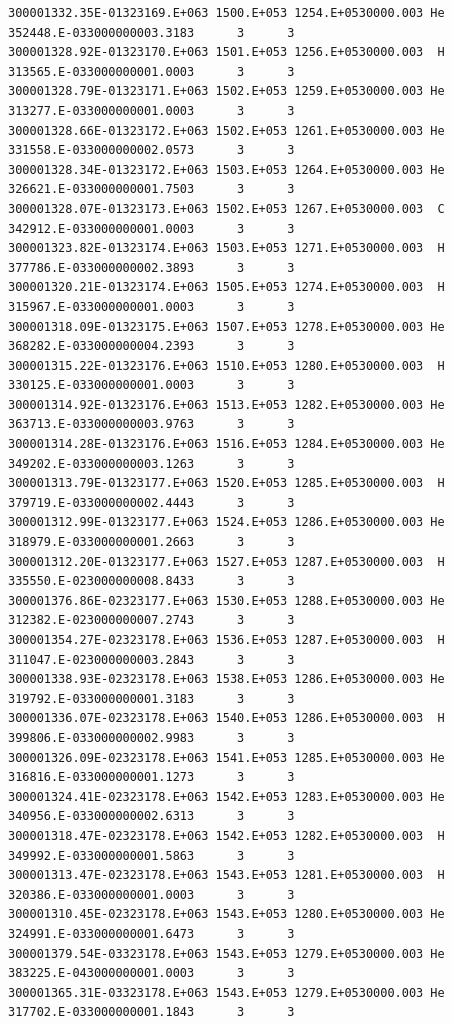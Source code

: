 \documentclass [11pt,a4paper,dvipdfmx] {jarticle}
\begin{document}
\begin{lstlisting}[caption={COLLISION.txtの例。1イベントのみ抽出。},basicstyle=\fontsize{6}{6}\ttfamily,identifierstyle=\fontsize{6}{6},numberstyle={\tiny},columns=fixed]
300001332.35E-01323169.E+063 1500.E+053 1254.E+0530000.003 He 352448.E-033000000003.3183      3      3
300001328.92E-01323170.E+063 1501.E+053 1256.E+0530000.003  H 313565.E-033000000001.0003      3      3
300001328.79E-01323171.E+063 1502.E+053 1259.E+0530000.003 He 313277.E-033000000001.0003      3      3
300001328.66E-01323172.E+063 1502.E+053 1261.E+0530000.003 He 331558.E-033000000002.0573      3      3
300001328.34E-01323172.E+063 1503.E+053 1264.E+0530000.003 He 326621.E-033000000001.7503      3      3
300001328.07E-01323173.E+063 1502.E+053 1267.E+0530000.003  C 342912.E-033000000001.0003      3      3
300001323.82E-01323174.E+063 1503.E+053 1271.E+0530000.003  H 377786.E-033000000002.3893      3      3
300001320.21E-01323174.E+063 1505.E+053 1274.E+0530000.003  H 315967.E-033000000001.0003      3      3
300001318.09E-01323175.E+063 1507.E+053 1278.E+0530000.003 He 368282.E-033000000004.2393      3      3
300001315.22E-01323176.E+063 1510.E+053 1280.E+0530000.003  H 330125.E-033000000001.0003      3      3
300001314.92E-01323176.E+063 1513.E+053 1282.E+0530000.003 He 363713.E-033000000003.9763      3      3
300001314.28E-01323176.E+063 1516.E+053 1284.E+0530000.003 He 349202.E-033000000003.1263      3      3
300001313.79E-01323177.E+063 1520.E+053 1285.E+0530000.003  H 379719.E-033000000002.4443      3      3
300001312.99E-01323177.E+063 1524.E+053 1286.E+0530000.003 He 318979.E-033000000001.2663      3      3
300001312.20E-01323177.E+063 1527.E+053 1287.E+0530000.003  H 335550.E-023000000008.8433      3      3
300001376.86E-02323177.E+063 1530.E+053 1288.E+0530000.003 He 312382.E-023000000007.2743      3      3
300001354.27E-02323178.E+063 1536.E+053 1287.E+0530000.003  H 311047.E-023000000003.2843      3      3
300001338.93E-02323178.E+063 1538.E+053 1286.E+0530000.003 He 319792.E-033000000001.3183      3      3
300001336.07E-02323178.E+063 1540.E+053 1286.E+0530000.003  H 399806.E-033000000002.9983      3      3
300001326.09E-02323178.E+063 1541.E+053 1285.E+0530000.003 He 316816.E-033000000001.1273      3      3
300001324.41E-02323178.E+063 1542.E+053 1283.E+0530000.003 He 340956.E-033000000002.6313      3      3
300001318.47E-02323178.E+063 1542.E+053 1282.E+0530000.003  H 349992.E-033000000001.5863      3      3
300001313.47E-02323178.E+063 1543.E+053 1281.E+0530000.003  H 320386.E-033000000001.0003      3      3
300001310.45E-02323178.E+063 1543.E+053 1280.E+0530000.003 He 324991.E-033000000001.6473      3      3
300001379.54E-03323178.E+063 1543.E+053 1279.E+0530000.003 He 383225.E-043000000001.0003      3      3
300001365.31E-03323178.E+063 1543.E+053 1279.E+0530000.003 He 317702.E-033000000001.1843      3      3

\end{lstlisting}
\end{document}
